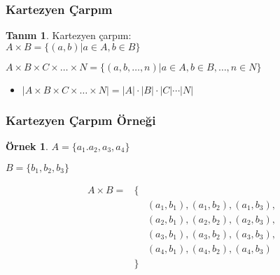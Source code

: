 \documentclass[dvipsnames]{beamer}
\theoremstyle{definition}
\newtheorem{tanim}[theorem]{Tanım}
\theoremstyle{example}
\newtheorem{ornek}[theorem]{Örnek}
\theoremstyle{plain}
\begin{document}
\begin{frame}
  \frametitle{Kartezyen Çarpım}

  \begin{tanim}
    \alert{Kartezyen çarpım}:\\
      $A \times B = \{(a,b) | a \in A, b \in B\}$

      \medskip
      $A \times B \times C \times \dots \times N =
        \{(a,b,\dots,n) | a \in A, b \in B, \ldots, n \in N\}$
  \end{tanim}

  \pause
  \medskip
  \begin{itemize}
    \item $|A \times B \times C \times \dots \times N| =
      |A| \cdot |B| \cdot |C| \cdots|N|$
  \end{itemize}
\end{frame}

\begin{frame}
  \frametitle{Kartezyen Çarpım Örneği}

  \begin{ornek}
    $A = \{a_1.a_2,a_3,a_4\}$

    $B = \{b_1,b_2,b_3\}$

    \medskip
    \begin{eqnarray*}
      A \times B = & \{ & \\
                   &    & (a_1,b_1),(a_1,b_2),(a_1,b_3),\\
                   &    & (a_2,b_1),(a_2,b_2),(a_2,b_3),\\
                   &    & (a_3,b_1),(a_3,b_2),(a_3,b_3),\\
                   &    & (a_4,b_1),(a_4,b_2),(a_4,b_3)\\
                   & \} &
    \end{eqnarray*}
  \end{ornek}
\end{frame}
\end{document}
